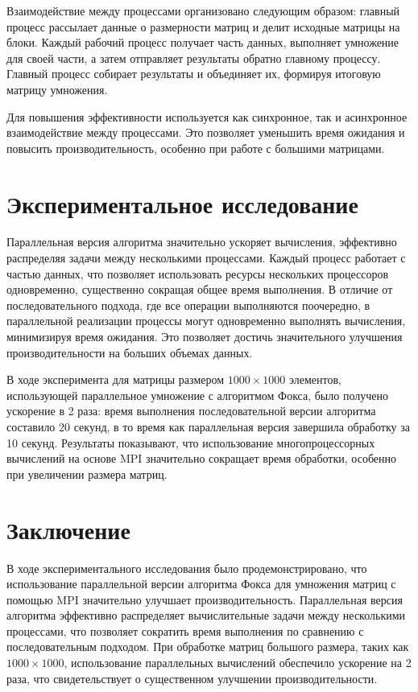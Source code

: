 \documentclass{report}
\begin{document}
Взаимодействие между процессами организовано следующим образом: главный процесс рассылает данные о размерности матриц и делит исходные матрицы на блоки. Каждый рабочий процесс получает часть данных, выполняет умножение для своей части, а затем отправляет результаты обратно главному процессу. Главный процесс собирает результаты и объединяет их, формируя итоговую матрицу умножения.

Для повышения эффективности используется как синхронное, так и асинхронное взаимодействие между процессами. Это позволяет уменьшить время ожидания и повысить производительность, особенно при работе с большими матрицами.

\newpage
\section*{Экспериментальное исследование}

Параллельная версия алгоритма значительно ускоряет вычисления, эффективно распределяя задачи между несколькими процессами. Каждый процесс работает с частью данных, что позволяет использовать ресурсы нескольких процессоров одновременно, существенно сокращая общее время выполнения. В отличие от последовательного подхода, где все операции выполняются поочередно, в параллельной реализации процессы могут одновременно выполнять вычисления, минимизируя время ожидания. Это позволяет достичь значительного улучшения производительности на больших объемах данных.

В ходе эксперимента для матрицы размером \(1000 \times 1000\) элементов, использующей параллельное умножение с алгоритмом Фокса, было получено ускорение в 2 раза: время выполнения последовательной версии алгоритма составило 20 секунд, в то время как параллельная версия завершила обработку за 10 секунд. Результаты показывают, что использование многопроцессорных вычислений на основе MPI значительно сокращает время обработки, особенно при увеличении размера матриц.
\newpage
\newpage
\section*{Заключение}

В ходе экспериментального исследования было продемонстрировано, что использование параллельной версии алгоритма Фокса для умножения матриц с помощью MPI значительно улучшает производительность. Параллельная версия алгоритма эффективно распределяет вычислительные задачи между несколькими процессами, что позволяет сократить время выполнения по сравнению с последовательным подходом. При обработке матриц большого размера, таких как \(1000 \times 1000\), использование параллельных вычислений обеспечило ускорение на 2 раза, что свидетельствует о существенном улучшении производительности.
\end{document}
